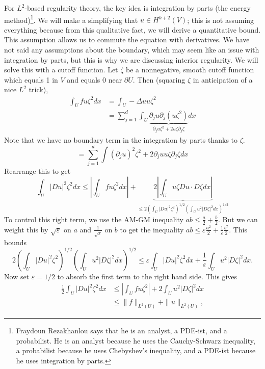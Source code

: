 For $L^{2}$-based regularity theory, the key idea is integration by parts (the energy method)\footnote{Fraydoun Rezakhanlou says that he is an analyst, a PDE-ist, and a probabilist. He is an analyst because he uses the Cauchy-Schwarz inequality, a probabilist because he uses Chebyshev's inequality, and a PDE-ist because he uses integration by parts.}. We will make a simplifying that $u \in H^{k+2}(V)$; this is not assuming everything because from this qualitative fact, we will derive a quantitative bound. This assumption allows us to commute the equation with derivatives. We have not said any assumptions about the boundary, which may seem like an issue with integration by parts, but this is why we are discussing interior regularity. We will solve this with a cutoff function.
Let $\zeta$ be a nonnegative, smooth cutoff function which equals 1 in $V$ and equals 0 near $\partial U$. Then (squaring $\zeta$ in anticipation of a nice $L^{2}$ trick),
$$
\begin{aligned}
\int_{U} f u \zeta^{2} d x &=\int_{U}-\Delta u u \zeta^{2} \\
&=\sum_{j=1}^{d} \int_{U} \underbrace{\partial_{j} u \partial_{j}\left(u \zeta^{2}\right)}_{\partial_{j} u \zeta^{2}+2 u \zeta \partial_{j} \zeta} d x
\end{aligned}
$$
Note that we have no boundary term in the integration by parts thanks to $\zeta$.
$$
=\sum_{j=1}^{d} \int\left(\partial_{j} u\right)^{2} \zeta^{2}+2 \partial_{j} u u \zeta \partial_{j} \zeta d x
$$
Rearrange this to get
$$
\int_{U}|D u|^{2} \zeta^{2} d x \leq\left|\int_{U} f u \zeta^{2} d x\right|+\underbrace{2\left|\int_{U} u \zeta D u \cdot D \zeta d x\right|}_{\leq 2\left(\int_{U}|D u|^{2} \zeta^{2}\right)^{1 / 2}\left(\int_{U} u^{2}|D \zeta|^{2} d x\right)^{1 / 2}}
$$
To control this right term, we use the AM-GM inequality $a b \leq \frac{a}{2}+\frac{b}{2}$. But we can weight this by $\sqrt{\varepsilon}$ on $a$ and $\frac{1}{\sqrt{\varepsilon}}$ on $b$ to get the inequality $a b \leq \varepsilon \frac{a^{2}}{2}+\frac{1}{\varepsilon} \frac{b^{2}}{2}$. This bounds
$$
2\left(\int_{U}|D u|^{2} \zeta^{2}\right)^{1 / 2}\left(\int_{U} u^{2}|D \zeta|^{2} d x\right)^{1 / 2} \leq \varepsilon \int_{U}|D u|^{2} \zeta^{2} d x+\frac{1}{\varepsilon} \int_{U} u^{2}|D \zeta|^{2} d x .
$$
Now set $\varepsilon=1 / 2$ to absorb the first term to the right hand side. This gives
$$
\begin{aligned}
\frac{1}{2} \int_{U}|D u|^{2} \zeta^{2} d x & \leq\left|\int_{U} f u \zeta^{2}\right|+2 \int_{U} u^{2}|D \zeta|^{2} d x \\
& \leq\|f\|_{L^{2}(U)}+\|u\|_{L^{2}(U)},
\end{aligned}
$$
